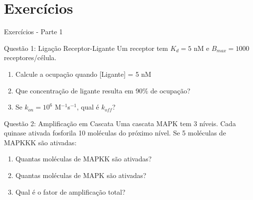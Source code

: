 \section{Exercícios}

\begin{frame}{Exercícios - Parte 1}
\begin{block}{Questão 1: Ligação Receptor-Ligante}
Um receptor tem $K_d = 5$ nM e $B_{max} = 1000$ receptores/célula.
\begin{enumerate}
    \item Calcule a ocupação quando [Ligante] = 5 nM
    \item Que concentração de ligante resulta em 90\% de ocupação?
    \item Se $k_{on} = 10^6$ M$^{-1}$s$^{-1}$, qual é $k_{off}$?
\end{enumerate}
\end{block}

\begin{block}{Questão 2: Amplificação em Cascata}
Uma cascata MAPK tem 3 níveis. Cada quinase ativada fosforila 10 moléculas do próximo nível. Se 5 moléculas de MAPKKK são ativadas:
\begin{enumerate}
    \item Quantas moléculas de MAPKK são ativadas?
    \item Quantas moléculas de MAPK são ativadas?
    \item Qual é o fator de amplificação total?
\end{enumerate}
\end{block}
\end{frame}

